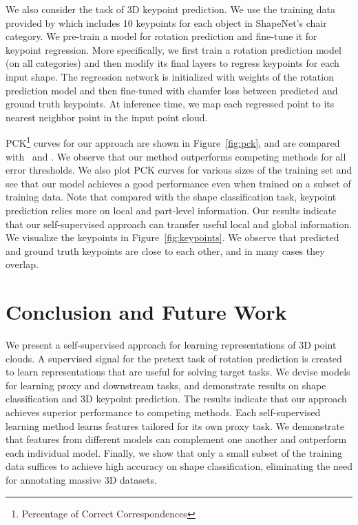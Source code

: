 \documentclass[10pt,twocolumn,letterpaper]{article}
\begin{document}
We also consider the task of 3D keypoint prediction.
We use the training data provided by \cite{yi2017syncspeccnn} which includes 10 keypoints for each object in ShapeNet's chair category.  We pre-train a model for rotation prediction and fine-tune it for keypoint regression. More specifically, we first train a rotation prediction model (on all categories) and then modify its final layers to regress  keypoints for each input shape. 
The regression network is initialized with weights of the rotation prediction model and then fine-tuned with chamfer loss between predicted and ground truth keypoints. 
At inference time, we map each regressed point to its nearest neighbor point in the input point cloud. 


PCK\footnote{Percentage of Correct Correspondences} curves for our approach are shown in Figure~\ref{fig:pck}, and are compared with~\cite{yi2017syncspeccnn} and \cite{huang2013fine}. We observe that our method outperforms competing methods for all error thresholds. 
We also plot PCK curves for various sizes of the training set and see that our model achieves a good performance even when trained on a subset of training data. 
Note that compared with the shape classification task, keypoint prediction relies more on local and part-level information. 
Our results indicate that our self-supervised approach can transfer useful local and global information. 
We visualize the keypoints in Figure~\ref{fig:keypoints}. We observe that predicted and ground truth keypoints are close to each other, and in many cases they overlap. 















\section{Conclusion and Future Work}

We present a self-supervised approach for learning representations of 3D point clouds. A supervised signal for the pretext task of rotation prediction is created to learn representations that are useful for solving target tasks. We devise models for learning proxy and downstream tasks, and demonstrate results on shape classification and 3D keypoint prediction.   
The results indicate that our approach achieves superior  performance to competing methods. 
Each self-supervised learning method learns features tailored for its own proxy task. We demonstrate that features from different models can complement one another and outperform each individual model.  Finally, we show that only a small subset of the training data suffices to achieve high accuracy on shape classification, eliminating the need for annotating massive 3D datasets. 
\end{document}
